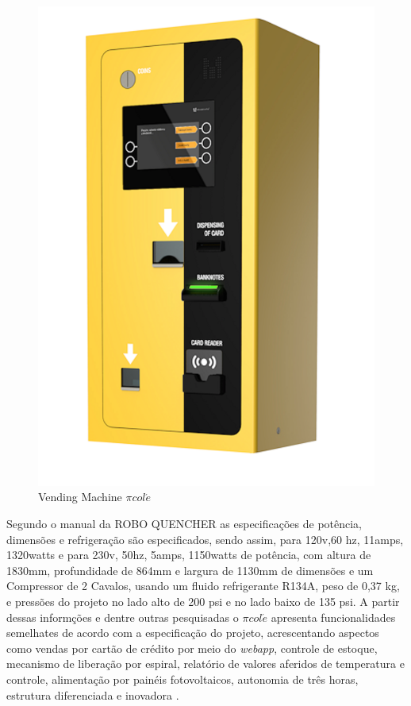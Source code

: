 \begin{figure}[H]
	\centering
    \includegraphics[scale=0.8]{figuras/vending_machine}
    \caption{Vending Machine $\pi col\acute{e}$}
    \label{fig:vending_machine}
\end{figure}

Segundo o manual da ROBO QUENCHER as especificações de potência, dimensões e refrigeração são especificados, sendo assim, para 120v,60 hz, 11amps, 1320watts e para  230v, 50hz, 5amps, 1150watts de potência, com altura de 1830mm, profundidade de 864mm e largura de 1130mm de dimensões e um Compressor de 2 Cavalos, usando um fluido refrigerante R134A, peso de 0,37 kg, e pressões do projeto no lado alto de 200 psi e no lado baixo de 135 psi. A partir dessas informções e dentre outras pesquisadas o $\pi col\acute{e}$ apresenta funcionalidades semelhates de acordo com a especificação do projeto, acrescentando aspectos como vendas por cartão de crédito por meio do \textit{webapp}, controle de estoque, mecanismo de liberação por espiral, relatório de valores aferidos de temperatura e controle, alimentação por painéis fotovoltaicos, autonomia de três horas, estrutura diferenciada e inovadora \cite{ROBOQUENCHER}.



